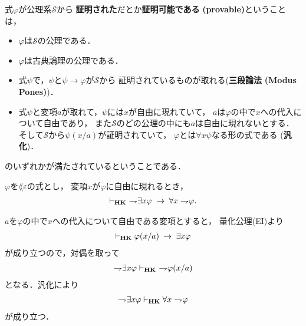 	\begin{screen}
		\begin{metadfn}[{\bf HK}における証明可能性]
			式$\varphi$が公理系$\mathscr{S}$から
			{\bf 証明された}だとか{\bf 証明可能である}
			{\bf (provable)}ということは，
			\begin{itemize}
				\item $\varphi$は$\mathscr{S}$の公理である．
				\item $\varphi$は古典論理の公理である．
				\item 式$\psi$で，$\psi$と$\psi \rightarrow \varphi$が$\mathscr{S}$から
				証明されているものが取れる({\bf 三段論法}
				{\bf (Modus Pones)})．
				\item 式$\psi$と変項$a$が取れて，$\psi$には$x$が自由に現れていて，
				$a$は$\varphi$の中で$x$への代入について自由であり，
				また$\mathscr{S}$のどの公理の中にも$a$は自由に現れないとする．
				そして$\mathscr{S}$から$\psi(x/a)$が証明されていて，
				$\varphi$とは$\forall x \psi$なる形の式である
				({\bf 汎化})．
			\end{itemize}
			のいずれかが満たされているということである．
		\end{metadfn}
	\end{screen}
	
	\begin{screen}
		\begin{thm}
			$\varphi$を$\lang{\varepsilon}$の式とし，
			変項$x$が$\varphi$に自由に現れるとき，
			\begin{align}
				\vdash_{{\scriptsize \mbox{{\bf HK}}}}
				\ \rightharpoondown\hspace{-0.25em} \exists x \varphi \hspace{0.25em}\rightarrow\hspace{0.25em} \forall x \rightharpoondown\hspace{-0.25em} \varphi.
			\end{align}
		\end{thm}
	\end{screen}
	
	\begin{sketch}
		$a$を$\varphi$の中で$x$への代入について自由である変項とすると，
		量化公理(EI)より
		\begin{align}
			\vdash_{{\scriptsize \mbox{{\bf HK}}}} \varphi(x/a) \hspace{0.25em}\rightarrow\hspace{0.25em} \exists x \varphi
		\end{align}
		が成り立つので，対偶を取って
		\begin{align}
			\rightharpoondown\hspace{-0.25em} \exists x \varphi \vdash_{{\scriptsize \mbox{{\bf HK}}}}
			\ \rightharpoondown\hspace{-0.25em} \varphi(x/a) 
		\end{align}
		となる．汎化により
		\begin{align}
			\rightharpoondown\hspace{-0.25em} \exists x \varphi \vdash_{{\scriptsize \mbox{{\bf HK}}}}
			\forall x \rightharpoondown\hspace{-0.25em} \varphi 
		\end{align}
		が成り立つ．
		\QED
	\end{sketch}
	
